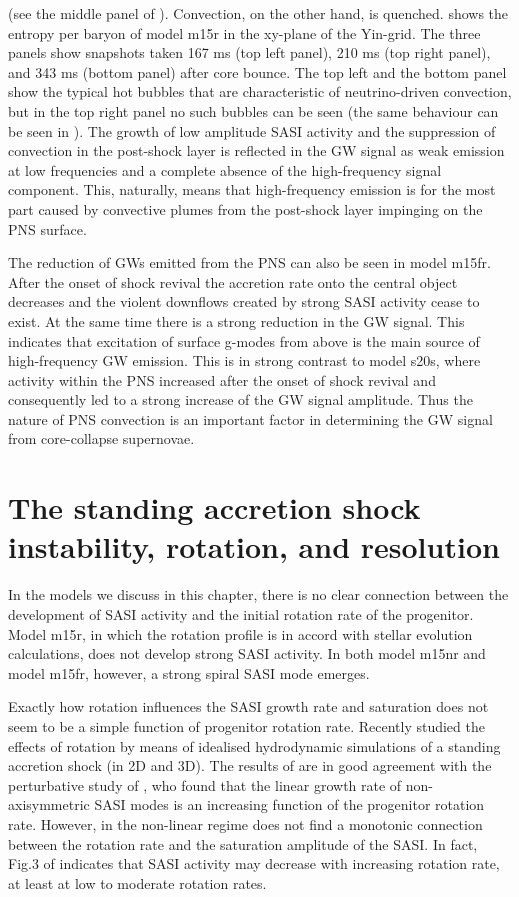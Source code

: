 (see the middle panel of ). Convection, on the other hand, is quenched. 
 shows the entropy per baryon of model m15r in the xy-plane of the Yin-grid.
The three panels show snapshots taken 167 ms (top left panel), 210 ms (top right panel), and 343 ms (bottom panel)
after core bounce. The top left and the bottom panel show the typical hot bubbles that are characteristic of
neutrino-driven convection, but in the top right panel no such bubbles can be seen (the same behaviour can be seen in
). 
The growth of low amplitude SASI activity and the suppression of convection in the post-shock layer is reflected
in the GW signal as weak emission at low frequencies and a complete absence of the high-frequency signal component.
This, naturally, means that high-frequency emission is for the most part caused by convective plumes from
the post-shock layer impinging on the PNS surface.

The reduction of GWs emitted from the PNS can also be seen in model m15fr. After the onset of shock revival
the accretion rate onto the central object decreases and the violent downflows created by strong SASI activity cease to exist. At the same time there is a strong reduction in the GW signal. This indicates
that excitation of surface g-modes from above is the main source of high-frequency GW emission.
This is in strong contrast to model s20s, where activity within the PNS increased after
the onset of shock revival and consequently led to a strong increase of the GW signal amplitude.
Thus the nature of PNS convection is an important factor in determining the 
GW signal from core-collapse supernovae.

\section{The standing accretion shock instability, rotation, and resolution}
In the models we discuss in this chapter, there is no clear connection between the development of SASI activity and the initial rotation rate of
the progenitor. Model m15r, in which the rotation profile is in accord with stellar
evolution calculations, does not develop strong SASI activity. In both model m15nr and model m15fr, however, a strong spiral SASI mode emerges. 

Exactly how rotation influences the SASI growth rate and saturation does not seem to be a simple function of progenitor rotation rate. Recently \cite{blondin_17} studied the effects of rotation by means of idealised hydrodynamic simulations of a standing accretion shock (in 2D and 3D). 
The results of \cite{blondin_17} are in good agreement with the perturbative study of \cite{yamasaki_08}, 
who found that the linear growth rate 
of non-axisymmetric SASI modes is an increasing function of the progenitor rotation rate.
However, in the non-linear regime \cite{kazeroni_17} does not find a monotonic connection between the
rotation rate and the saturation amplitude of the SASI. In fact, Fig.3 of \cite{kazeroni_17} indicates that
SASI activity may decrease with increasing rotation rate, at least at low to moderate rotation rates. 

